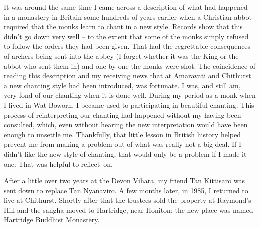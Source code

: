 It was around the same time I came across a description of what had
happened in a monastery in Britain some hundreds of years earlier when a
Christian abbot required that the monks learn to chant in a new style.
Records show that this didn't go down very well -- to the extent that
some of the monks simply refused to follow the orders they had been
given. That had the regrettable consequences of archers being sent into
the abbey (I forget whether it was the King or the abbot who sent them
in) and one by one the monks were shot. The coincidence of reading this
description and my receiving news that at Amaravati and Chithurst a new
chanting style had been introduced, was fortunate. I was, and still am,
very fond of our chanting when it is done well. During my period as a
monk when I lived in Wat Boworn, I became used to participating in
beautiful chanting. This process of reinterpreting our chanting had
happened without my having been consulted, which, even without hearing
the new interpretation would have been enough to unsettle me.
Thankfully, that little lesson in British history helped prevent me from
making a problem out of what was really not a big deal. If I didn't like
the new style of chanting, that would only be a problem if I made it
one. That was helpful to reflect~on.

After a little over two years at the Devon Vihara, my friend Tan
Kittisaro was sent down to replace Tan Nyanaviro. A few months later, in
1985, I returned to live at Chithurst. Shortly after that the trustees
sold the property at Raymond's Hill and the sangha moved to Hartridge,
near Honiton; the new place was named
Hartridge Buddhist Monastery\cite{hartridge}.
